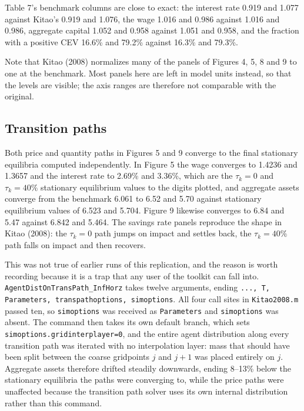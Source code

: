 \documentclass[11pt,fleqn]{article}
\begin{document}
Table 7's benchmark columns are close to exact: the interest rate 0.919 and 1.077 against Kitao's 0.919 and 1.076, the wage 1.016 and 0.986 against 1.016 and 0.986, aggregate capital 1.052 and 0.958 against 1.051 and 0.958, and the fraction with a positive CEV 16.6\% and 79.2\% against 16.3\% and 79.3\%.

Note that Kitao (2008) normalizes many of the panels of Figures 4, 5, 8 and 9 to one at the benchmark. Most panels here are left in model units instead, so that the levels are visible; the axis ranges are therefore not comparable with the original.

\subsection*{Transition paths}
Both price and quantity paths in Figures 5 and 9 converge to the final stationary equilibria computed independently. In Figure 5 the wage converges to 1.4236 and 1.3657 and the interest rate to 2.69\% and 3.36\%, which are the $\tau_k=0$ and $\tau_k=40\%$ stationary equilibrium values to the digits plotted, and aggregate assets converge from the benchmark 6.061 to 6.52 and 5.70 against stationary equilibrium values of 6.523 and 5.704. Figure 9 likewise converges to 6.84 and 5.47 against 6.842 and 5.464. The savings rate panels reproduce the shape in Kitao (2008): the $\tau_k=0$ path jumps on impact and settles back, the $\tau_k=40\%$ path falls on impact and then recovers.

This was not true of earlier runs of this replication, and the reason is worth recording because it is a trap that any user of the toolkit can fall into. \texttt{AgentDistOnTransPath\_InfHorz} takes twelve arguments, ending \texttt{..., T, Parameters, transpathoptions, simoptions}. All four call sites in \texttt{Kitao2008.m} passed ten, so \texttt{simoptions} was received as \texttt{Parameters} and \texttt{simoptions} was absent. The command then takes its own default branch, which sets \texttt{simoptions.gridinterplayer=0}, and the entire agent distribution along every transition path was iterated with no interpolation layer: mass that should have been split between the coarse gridpoints $j$ and $j+1$ was placed entirely on $j$. Aggregate assets therefore drifted steadily downwards, ending 8--13\% below the stationary equilibria the paths were converging to, while the price paths were unaffected because the transition path solver uses its own internal distribution rather than this command.
\end{document}
